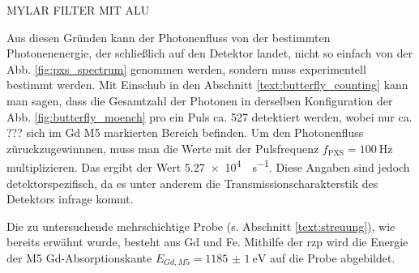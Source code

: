MYLAR FILTER MIT ALU

\noindent
Aus diesen Gründen kann der Photonenfluss von der bestimmten Photonenenergie, der schließlich auf den Detektor landet, nicht so einfach von der Abb. \ref{fig:pxs_spectrum} genommen werden, sondern muss experimentell bestimmt werden. Mit Einschub in den Abschnitt \ref{text:butterfly_counting} kann man sagen, dass die Gesamtzahl der Photonen in derselben Konfiguration der Abb. \ref{fig:butterfly_moench} pro ein Puls ca. 527 detektiert werden, wobei nur ca. ??? sich im Gd M5 markierten Bereich befinden. Um den Photonenfluss züruckzugewinnnen, muss man die Werte mit der Pulsfrequenz $f_\text{PXS} = \SI{100}{\hertz}$ multiplizieren. Das ergibt der Wert \SI{5.27e4}{\photons\per\second}.  Diese Angaben sind jedoch detektorspezifisch, da es unter anderem die Transmissionscharakterstik des Detektors infrage kommt.


\noindent
Die zu untersuchende mehrschichtige Probe (s. Abschnitt \ref{text:streuung}), wie bereits erwähnt wurde, besteht aus Gd und Fe. Mithilfe der \gls{rzp} wird die Energie der M5 Gd-Absorptionskante $E_{Gd, M5} = \SI{1185(1)}{\eV}$ \cite[Abb. 6(a)]{prieto_x-ray_2005} auf die Probe abgebildet.